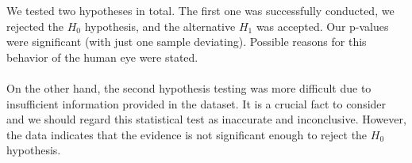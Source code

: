 \documentclass[a4paper]{article}
\begin{document}
We tested two hypotheses in total. The first one was successfully conducted, we rejected the $H_0$ hypothesis, and the alternative $H_1$ was accepted.
Our p-values were significant (with just one sample deviating). Possible reasons for this behavior of the human eye were stated.
\\
\\
On the other hand, the second hypothesis testing was more difficult due to insufficient information provided in the dataset. 
It is a crucial fact to consider and we should regard this statistical test as inaccurate and inconclusive. 
However, the data indicates that the evidence is not significant enough to reject the $H_0$ hypothesis.
\end{document}
